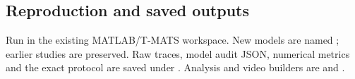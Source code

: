 \subsection{Reproduction and saved outputs}
Run  in the existing MATLAB/T-MATS workspace. New models are named ; earlier studies are preserved. Raw traces, model audit JSON, numerical metrics and the exact protocol are saved under . Analysis and video builders are  and .


